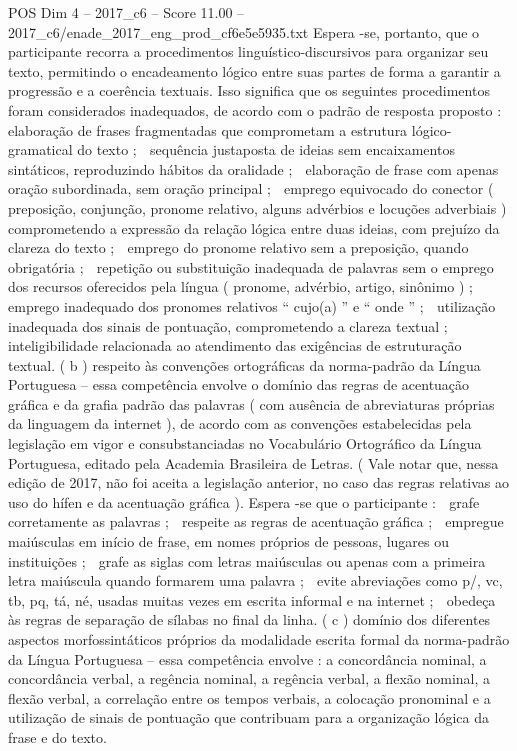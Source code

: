 \begin{textsample}{POS Dim 4 – 2017\_c6 – Score 11.00 – 2017\_c6/enade\_2017\_eng\_prod\_cf6e5e5935.txt}
Espera -se, portanto, que o participante recorra a procedimentos linguístico-discursivos para organizar seu texto, permitindo o encadeamento lógico entre suas partes de forma a garantir a progressão e a coerência textuais.
Isso significa que os seguintes procedimentos foram considerados inadequados, de acordo com o padrão de resposta proposto :  elaboração de frases fragmentadas que comprometam a estrutura lógico-gramatical do texto ;  sequência justaposta de ideias sem encaixamentos sintáticos, reproduzindo hábitos da oralidade ;  elaboração de frase com apenas oração subordinada, sem oração principal ;  emprego equivocado do conector ( preposição, conjunção, pronome relativo, alguns advérbios e locuções adverbiais ) comprometendo a expressão da relação lógica entre duas ideias, com prejuízo da clareza do texto ;  emprego do pronome relativo sem a preposição, quando obrigatória ;  repetição ou substituição inadequada de palavras sem o emprego dos recursos oferecidos pela língua ( pronome, advérbio, artigo, sinônimo ) ;  emprego inadequado dos pronomes relativos “ cujo(a) ” e “ onde ” ;  utilização inadequada dos sinais de pontuação, comprometendo a clareza textual ;  inteligibilidade relacionada ao atendimento das exigências de estruturação textual. ( b ) respeito às convenções ortográficas da norma-padrão da Língua Portuguesa – essa competência envolve o domínio das regras de acentuação gráfica e da grafia padrão das palavras ( com ausência de abreviaturas próprias da linguagem da internet ), de acordo com as convenções estabelecidas pela legislação em vigor e consubstanciadas no Vocabulário Ortográfico da Língua Portuguesa, editado pela Academia Brasileira de Letras. ( Vale notar que, nessa edição de 2017, não foi aceita a legislação anterior, no caso das regras relativas ao uso do hífen e da acentuação gráfica ).
Espera -se que o participante :  grafe corretamente as palavras ;  respeite as regras de acentuação gráfica ;  empregue maiúsculas em início de frase, em nomes próprios de pessoas, lugares ou instituições ;  grafe as siglas com letras maiúsculas ou apenas com a primeira letra maiúscula quando formarem uma palavra ;  evite abreviações como p/, vc, tb, pq, tá, né, usadas muitas vezes em escrita informal e na internet ;  obedeça às regras de separação de sílabas no final da linha. ( c ) domínio dos diferentes aspectos morfossintáticos próprios da modalidade escrita formal da norma-padrão da Língua Portuguesa – essa competência envolve : a concordância nominal, a concordância verbal, a regência nominal, a regência verbal, a flexão nominal, a flexão verbal, a correlação entre os tempos verbais, a colocação pronominal e a utilização de sinais de pontuação que contribuam para a organização lógica da frase e do texto.

\end{textsample}
